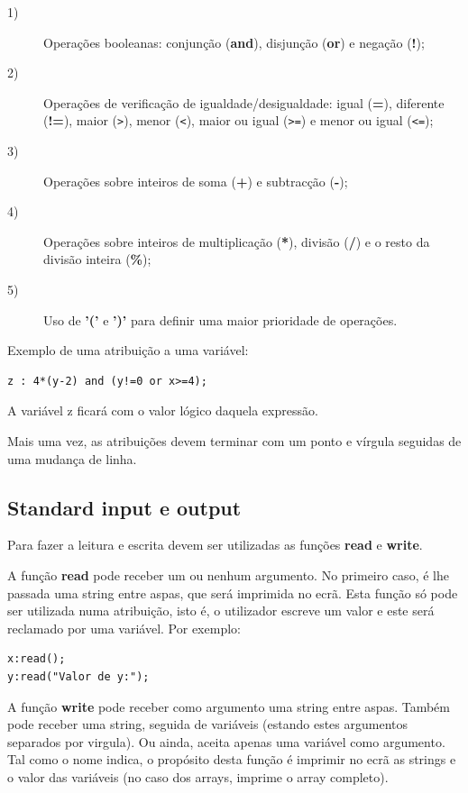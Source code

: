 \documentclass{article}
\begin{document}
\begin{description}
\item[1)] Operações booleanas: conjunção (\textbf{and}), disjunção (\textbf{or}) e negação (\textbf{!});
\item[2)] Operações de verificação de igualdade/desigualdade: igual (\textbf{=}), diferente (\textbf{!=}), maior ({\tt >}), menor ({\tt <}), maior ou igual ({\tt >=}) e menor ou igual ({\tt <=});
\item[3)] Operações sobre inteiros de soma (\textbf{+}) e subtracção (\textbf{-});
\item[4)] Operações sobre inteiros de multiplicação (\textbf{*}), divisão (\textbf{/}) e o resto da divisão inteira (\textbf{\%});
\item[5)] Uso de \textbf{'('} e \textbf{')'} para definir uma maior prioridade de operações.
\end{description}

Exemplo de uma atribuição a uma variável:
\begin{lstlisting}[firstnumber=0]
z : 4*(y-2) and (y!=0 or x>=4);
\end{lstlisting}
A variável z ficará com o valor lógico daquela expressão. 
\par Mais uma vez, as atribuições devem terminar com um ponto e vírgula seguidas de uma mudança de linha.


\subsection{Standard input e output}
\setlength{\parindent}{5ex} Para fazer a leitura e escrita devem ser utilizadas as funções \textbf{read} e \textbf{write}. 
\par A função \textbf{read} pode receber um ou nenhum argumento. No primeiro caso, é lhe passada uma string entre aspas, que será imprimida no ecrã. Esta função só pode ser utilizada numa atribuição, isto é, o utilizador escreve um valor e este será reclamado por uma variável. Por exemplo:
\begin{lstlisting}[firstnumber=0]
x:read();
y:read("Valor de y:");
\end{lstlisting}

\par A função \textbf{write} pode receber como argumento uma string entre aspas. Também pode receber uma string, seguida de variáveis (estando estes argumentos separados por virgula). Ou ainda, aceita apenas uma variável como argumento. Tal como o nome indica, o propósito desta função é imprimir no ecrã as strings e o valor das variáveis (no caso dos arrays, imprime o array completo).
\end{document}
